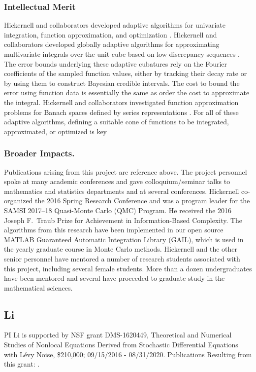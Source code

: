 \documentclass[11pt]{NSFamsart}
\begin{document}
\subsubsection*{Intellectual Merit}
Hickernell and collaborators developed adaptive algorithms for univariate integration, function approximation, and optimization \cite{ChoEtal17a,HicEtal14b, Din15a, Ton14a, Zha18a}.
Hickernell and collaborators developed globally adaptive algorithms for approximating multivariate integrals over the unit cube based on low discrepancy sequences \cite{HicJim16a,HicEtal17a,JimHic16a,RatHic19a}.  The error bounds underlying these adaptive cubatures rely on the Fourier coefficients of the sampled function values, either by tracking their decay rate or by using them to construct Bayesian credible intervals. The cost to bound the error using function data is essentially the same as order the cost to approximate the integral. 
Hickernell and collaborators investigated function approximation problems for Banach spaces defined by series representations \cite{DinHic20a,DinEtal20a}.  For all of these adaptive algorithms, defining a suitable cone of functions to be integrated, approximated, or optimized is key

\subsubsection*{Broader Impacts.}
Publications arising from this project are reference above.  
The project personnel spoke at many academic conferences and gave colloquium/seminar talks to mathematics and statistics departments and at several conferences.  Hickernell co-organized the 2016 Spring Research Conference and was a program leader for the SAMSI 2017--18 Quasi-Monte Carlo (QMC) Program.   He received the 2016 Joseph F.\ Traub Prize for Achievement in Information-Based Complexity. The algorithms from this research have been implemented in our open source MATLAB Guaranteed Automatic Integration Library (GAIL), which is used in the yearly graduate course in Monte Carlo methods.  Hickernell and the other senior personnel have mentored a number of research students associated with this project, including several female students.  More than a dozen undergraduates have been mentored and several have proceeded to graduate study in the mathematical sciences. 

\subsection*{Li} PI Li is supported by NSF grant  DMS-1620449, Theoretical and Numerical Studies of Nonlocal Equations Derived from Stochastic Differential Equations with L\'evy Noise, \$210,000; 09/15/2016 - 08/31/2020. Publications Resulting from this grant:
 \cite{ChenWu, ChenXL2020,  DannyTesfay,GaoTing2016, Gao2016,    Liu2019LvyNI, Lv2016OnAS, QiaoDuan2018,Wang2018NumericalAF, YangDuanWiggins2020,ZhangZhuanDuan,ZhengDuan2017,ZhengYY2020}.
\end{document}
